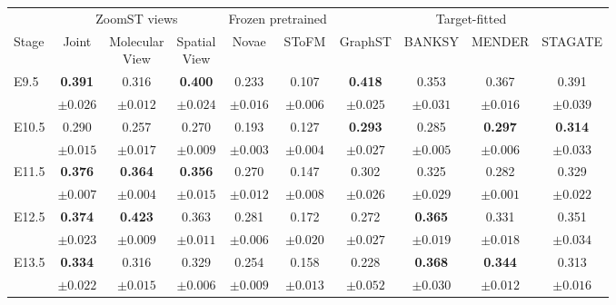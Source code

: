 \begin{tabular}{lccccccccc}
\toprule
 & \multicolumn{3}{c}{ZoomST views} & \multicolumn{2}{c}{Frozen pretrained} & \multicolumn{4}{c}{Target-fitted} \\
\cmidrule(lr){2-4}\cmidrule(lr){5-6}\cmidrule(lr){7-10}
Stage & Joint & \shortstack{Molecular\\View} & \shortstack{Spatial\\View} & Novae & SToFM & GraphST & BANKSY & MENDER & STAGATE \\
\midrule
E9.5 & \textbf{0.391} & 0.316 & \textbf{0.400} & 0.233 & 0.107 & \textbf{0.418} & 0.353 & 0.367 & 0.391 \\
 & {\scriptsize $\pm 0.026$} & {\scriptsize $\pm 0.012$} & {\scriptsize $\pm 0.024$} & {\scriptsize $\pm 0.016$} & {\scriptsize $\pm 0.006$} & {\scriptsize $\pm 0.025$} & {\scriptsize $\pm 0.031$} & {\scriptsize $\pm 0.016$} & {\scriptsize $\pm 0.039$} \\
\addlinespace[2pt]
E10.5 & 0.290 & 0.257 & 0.270 & 0.193 & 0.127 & \textbf{0.293} & 0.285 & \textbf{0.297} & \textbf{0.314} \\
 & {\scriptsize $\pm 0.015$} & {\scriptsize $\pm 0.017$} & {\scriptsize $\pm 0.009$} & {\scriptsize $\pm 0.003$} & {\scriptsize $\pm 0.004$} & {\scriptsize $\pm 0.027$} & {\scriptsize $\pm 0.005$} & {\scriptsize $\pm 0.006$} & {\scriptsize $\pm 0.033$} \\
\addlinespace[2pt]
E11.5 & \textbf{0.376} & \textbf{0.364} & \textbf{0.356} & 0.270 & 0.147 & 0.302 & 0.325 & 0.282 & 0.329 \\
 & {\scriptsize $\pm 0.007$} & {\scriptsize $\pm 0.004$} & {\scriptsize $\pm 0.015$} & {\scriptsize $\pm 0.012$} & {\scriptsize $\pm 0.008$} & {\scriptsize $\pm 0.026$} & {\scriptsize $\pm 0.029$} & {\scriptsize $\pm 0.001$} & {\scriptsize $\pm 0.022$} \\
\addlinespace[2pt]
E12.5 & \textbf{0.374} & \textbf{0.423} & 0.363 & 0.281 & 0.172 & 0.272 & \textbf{0.365} & 0.331 & 0.351 \\
 & {\scriptsize $\pm 0.023$} & {\scriptsize $\pm 0.009$} & {\scriptsize $\pm 0.011$} & {\scriptsize $\pm 0.006$} & {\scriptsize $\pm 0.020$} & {\scriptsize $\pm 0.027$} & {\scriptsize $\pm 0.019$} & {\scriptsize $\pm 0.018$} & {\scriptsize $\pm 0.034$} \\
\addlinespace[2pt]
E13.5 & \textbf{0.334} & 0.316 & 0.329 & 0.254 & 0.158 & 0.228 & \textbf{0.368} & \textbf{0.344} & 0.313 \\
 & {\scriptsize $\pm 0.022$} & {\scriptsize $\pm 0.015$} & {\scriptsize $\pm 0.006$} & {\scriptsize $\pm 0.009$} & {\scriptsize $\pm 0.013$} & {\scriptsize $\pm 0.052$} & {\scriptsize $\pm 0.030$} & {\scriptsize $\pm 0.012$} & {\scriptsize $\pm 0.016$} \\

\end{tabular}
